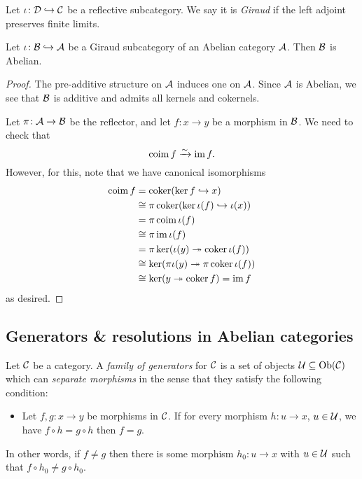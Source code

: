 \begin{definition}
	Let \(\iota\!:\mathcal{D}\hookrightarrow\mathcal{C}\) be a reflective subcategory. We say it is \emph{Giraud} if the left adjoint preserves finite limits.
\end{definition}
\begin{theorem}\label{thm:giraud-subcategory-of-abelian-category-is-abelian}
	Let \(\iota\!:\mathcal{B}\hookrightarrow\mathcal{A}\) be a Giraud subcategory of an Abelian category \(\mathcal{A}\). Then \(\mathcal{B}\) is Abelian.
\end{theorem}
\begin{proof}
The pre-additive structure on \(\mathcal{A}\) induces one on \(\mathcal{A}\). Since \(\mathcal{A}\) is Abelian, we see that \(\mathcal{B}\) is additive and admits all kernels and cokernels.

Let \(\pi\!:\mathcal{A}\to\mathcal{B}\) be the reflector, and let \(f\!:x\to y\) be a morphism in \(\mathcal{B}\). We need to check that
\[ \operatorname{coim}{f}\xrightarrow{\sim}\operatorname{im}{f}. \]
However, for this, note that we have canonical isomorphisms
\begin{align*}
	\operatorname{coim}{f} &= \operatorname{coker}(\ker{f}\hookrightarrow x)\\
	&\cong \pi\operatorname{coker}(\ker\iota(f)\hookrightarrow\iota(x))\\
	&= \pi\operatorname{coim}\iota(f) \\
	&\cong \pi\operatorname{im}\iota(f) \\
	&= \pi\ker(\iota(y)\twoheadrightarrow \operatorname{coker}\iota(f)) \\
	&\cong \ker(\pi\iota(y)\twoheadrightarrow \pi\operatorname{coker}\iota(f)) \\
	&\cong \ker(y\twoheadrightarrow \operatorname{coker}{f}) = \operatorname{im}{f}
\end{align*}
as desired.
\end{proof}

\subsection{Generators \& resolutions in Abelian categories}
\begin{definition}
	Let \(\mathcal{C}\) be a category. A \emph{family of generators} for \(\mathcal{C}\) is a set of objects \(\mathcal{U}\subseteq\operatorname{Ob}(\mathcal{C})\) which can \emph{separate morphisms} in the sense that
	they satisfy the following condition:
	\begin{itemize}[label=\(\star\)]
	\item Let \(f,g\!:x\to y\) be morphisms in \(\mathcal{C}\). If for every morphism \(h\!:u\to x\), \(u\in\mathcal{U}\), we have \(f\circ h = g\circ h\) then \(f = g\).
	\end{itemize}
	In other words, if \(f\not= g\) then there is some morphism \(h_0\!:u\to x\) with \(u\in\mathcal{U}\) such that \(f\circ h_0\not= g\circ h_0\).
\end{definition}

